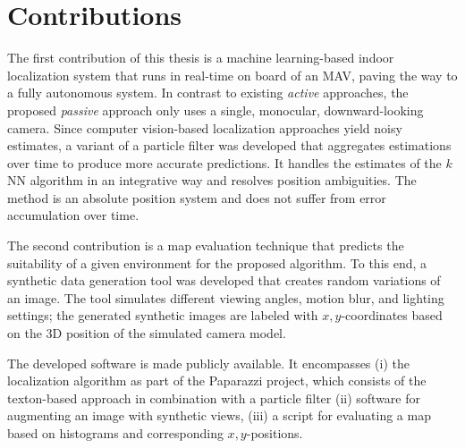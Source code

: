 \section{Contributions}
\label{sec:contributions}

The first contribution of this thesis is a machine learning-based
indoor localization system that runs in real-time on board
of an MAV, paving the way to a fully autonomous system. In contrast to
existing \emph{active} approaches, the proposed \emph{passive}
approach only uses a single, monocular, downward-looking camera. Since
computer vision-based localization approaches yield noisy estimates, a
variant of a particle filter was developed that aggregates estimations
over time to produce more accurate predictions. It handles the
estimates of the $k$NN algorithm in an integrative way and resolves
position ambiguities. The method is an absolute position system and does not suffer from error
accumulation over time.

The second contribution is a map evaluation technique that predicts
the suitability of a given environment for the proposed algorithm. To
this end, a synthetic data generation tool was developed that creates
random variations of an image. The tool simulates different viewing
angles, motion blur, and lighting settings; the generated synthetic
images are labeled with $x,y$-coordinates based on the 3D position of
the simulated camera model.

The developed software is made publicly available. It encompasses (i)
the localization algorithm as part of the Paparazzi project, which
consists of the texton-based approach in combination with a particle
filter (ii) software for augmenting an image with synthetic views,
(iii) a script for evaluating a map based on histograms and
corresponding $x,y$-positions.


